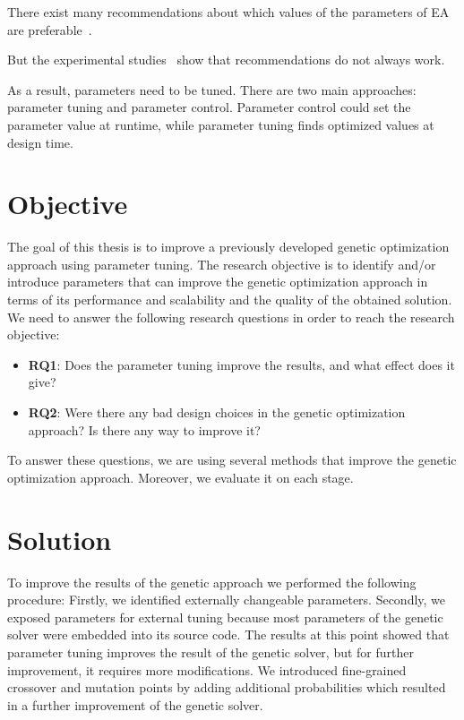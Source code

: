 There exist many recommendations about which values of the parameters of EA are preferable~\cite{de2007parameter, sipper2018investigating}.  

But the experimental studies~\cite{de2007parameter, shahookar1990genetic, gockel1997influencing} show that recommendations do not always work. 

As a result, parameters need to be tuned. There are two main approaches: parameter tuning and parameter control. Parameter control could set the parameter value at runtime, while parameter tuning finds optimized values at design time.




\section{Objective}
The goal of this thesis is to improve a previously developed genetic optimization approach using parameter tuning.
The research objective is to identify and/or introduce parameters that can improve the genetic optimization approach in terms of its performance and scalability and the quality of the obtained solution. We need to answer the following research questions in order to reach the research objective: 
\begin{itemize}
	\item \textbf{RQ1}: Does the parameter tuning improve the results, and what effect does it give?
	\item \textbf{RQ2}: Were there any bad design choices in the genetic optimization approach? Is there any way to improve it?
\end{itemize}

To answer these questions, we are using several methods that improve the genetic optimization approach. Moreover, we evaluate it on each stage. 

\section{Solution}

To improve the results of the genetic approach we performed the following procedure:
Firstly, we identified externally changeable parameters. 
Secondly, we exposed parameters for external tuning because most parameters of the genetic solver were embedded into its source code. 
The results at this point showed that parameter tuning improves the result of the genetic solver, but for further improvement, it requires more modifications.
We introduced fine-grained crossover and mutation points by adding additional probabilities which resulted in a further improvement of the genetic solver.

